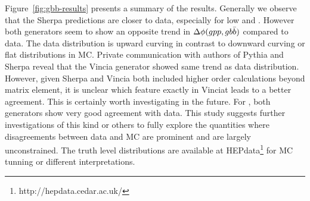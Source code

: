 \label{sec:gbb-results}

Figure~\ref{fig:gbb-results} presents a summary of the results. Generally we observe that the Sherpa predictions are closer to data, especially for low \zpt and \mpt. However both generators seem to show an opposite trend in $\Delta \phi(gpp,gb\bar{b})$ compared to data. The data distribution is upward curving in contrast to downward curving or flat distributions in MC. Private communication with authors of Pythia and Sherpa reveal that the Vincia generator showed same trend as data distribution. However, given Sherpa and Vincia both included higher order calculations beyond matrix element, it is unclear which feature exactly in Vinciat leads to a better agreement. This is certainly worth investigating in the future. For \drbb, both generators show very good agreement with data. This study suggests further investigations of this kind or others to fully explore the quantities where disagreements between data and MC are prominent and are largely unconstrained. The truth level distributions are available at HEPdata\footnote{http://hepdata.cedar.ac.uk/} for MC tunning or different interpretations. 

